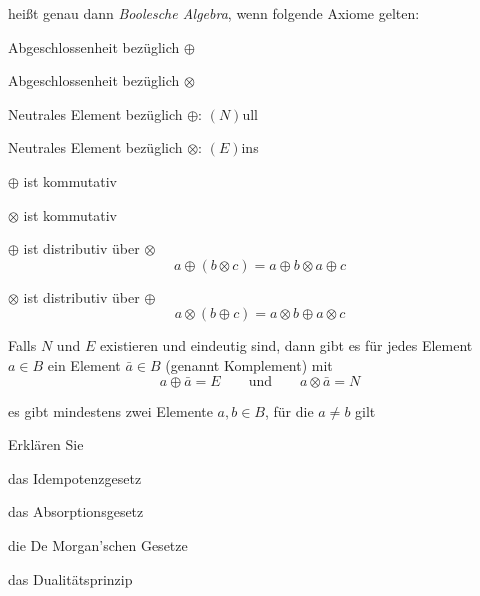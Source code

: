 \documentclass
[
  draft    = true,
  fontsize = 11pt,
  parskip  = half-,
  BCOR     = 0pt,
  DIV      = 11,
  ngerman,
  dvipsnames
]
{scrartcl}
\begin{document}
\begin{mytemize}
\begin{achim}
          heißt genau dann \emph{Boolesche Algebra}, wenn folgende Axiome gelten:
          \begin{mytemize}
            \item Abgeschlossenheit bezüglich $\oplus$
            \item Abgeschlossenheit bezüglich $\otimes$
            \item Neutrales Element bezüglich $\oplus$: $(N)$ull
            \item Neutrales Element bezüglich $\otimes$: $(E)$ins
            \item $\oplus$ ist kommutativ
            \item $\otimes$ ist kommutativ
            \item $\oplus$ ist distributiv über $\otimes$
                  \begin{equation*}
                    a\oplus(b\otimes c)=a\oplus b\otimes a\oplus c
                  \end{equation*}
            \item $\otimes$ ist distributiv über $\oplus$
                  \begin{equation*}
                    a\otimes(b\oplus c)=a\otimes b\oplus a\otimes c
                  \end{equation*}
            \item Falls $N$ und $E$ existieren und eindeutig sind,
                  dann gibt es für jedes Element $a\in B$ ein Element $\bar{a}\in B$
                  (genannt Komplement) mit
                  \begin{equation*}
                    a\oplus\bar{a}=E
                    \qquad\text{und}\qquad
                    a\otimes\bar{a}=N
                  \end{equation*}
            \item es gibt mindestens zwei Elemente $a,b\in B$, für die $a\neq b$ gilt
          \end{mytemize}
        \end{achim}
  \item Erklären Sie
        \begin{mytemize}
          \item das Idempotenzgesetz
          \item das Absorptionsgesetz
          \item die De Morgan'schen Gesetze
          \item das Dualitätsprinzip
        \end{mytemize}

\end{mytemize}
\end{document}

